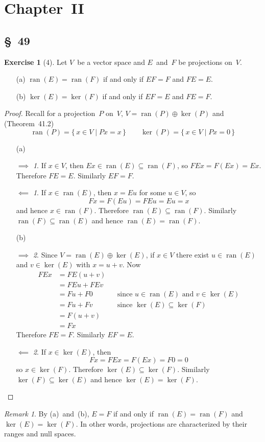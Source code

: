 \documentclass[letterpaper,12pt]{article}
\newcommand{\dsum}{\oplus}
\DeclareMathOperator{\ran}{ran}
\theoremstyle{definition}
\newtheorem*{exer}{Exercise}
\theoremstyle{remark}
\newtheorem*{rmk}{Remark}
\theoremstyle{direction}
\newtheorem*{fwd}{\(\implies\)}
\newtheorem*{bwd}{\(\impliedby\)}
\begin{document}
\section*{Chapter~II}
\subsection*{\S~49}
\begin{exer}[4]
Let \(V\)~be a vector space and \(E\)~and~\(F\) be projections on~\(V\).
\begin{enumerate}[itemsep=0pt]
\item[(a)] \(\ran(E)=\ran(F)\) if and only if \(EF=F\) and \(FE=E\).
\item[(b)] \(\ker(E)=\ker(F)\) if and only if \(EF=E\) and \(FE=F\).
\end{enumerate}
\end{exer}
\begin{proof}
Recall for a projection~\(P\) on~\(V\), \(V=\ran(P)\dsum\ker(P)\) and (Theorem~41.2)
\[\ran(P)=\{\,x\in V\mid Px=x\,\}\qquad\ker(P)=\{\,x\in V\mid Px=0\,\}\]
\begin{enumerate}[itemsep=0pt]
\item[(a)]
\begin{fwd}
If \(x\in V\), then \(Ex\in\ran(E)\subseteq\ran(F)\), so \(FEx=F(Ex)=Ex\). Therefore \(FE=E\). Similarly \(EF=F\).
\end{fwd}
\begin{bwd}
If \(x\in\ran(E)\), then \(x=Eu\) for some \(u\in V\), so
\[Fx=F(Eu)=FEu=Eu=x\]
and hence \(x\in\ran(F)\). Therefore \(\ran(E)\subseteq\ran(F)\). Similarly \(\ran(F)\subseteq\ran(E)\) and hence \(\ran(E)=\ran(F)\).
\end{bwd}
\item[(b)]
\begin{fwd}
Since \(V=\ran(E)\dsum\ker(E)\), if \(x\in V\) there exist \(u\in\ran(E)\) and \(v\in\ker(E)\) with \(x=u+v\). Now
\begin{align*}
FEx&=FE(u+v)&&\\
	&=FEu+FEv&&\\
	&=Fu+F0&&\text{since \(u\in\ran(E)\) and \(v\in\ker(E)\)}\\
	&=Fu+Fv&&\text{since \(\ker(E)\subseteq\ker(F)\)}\\
	&=F(u+v)\\
	&=Fx
\end{align*}
Therefore \(FE=F\). Similarly \(EF=E\).
\end{fwd}
\begin{bwd}
If \(x\in\ker(E)\), then
\[Fx=FEx=F(Ex)=F0=0\]
so \(x\in\ker(F)\). Therefore \(\ker(E)\subseteq\ker(F)\). Similarly \(\ker(F)\subseteq\ker(E)\) and hence \(\ker(E)=\ker(F)\).\qedhere
\end{bwd}
\end{enumerate}
\end{proof}
\begin{rmk}
By (a)~and~(b), \(E=F\) if and only if \(\ran(E)=\ran(F)\) and \(\ker(E)=\ker(F)\). In other words, projections are characterized by their ranges and null spaces.
\end{rmk}
\end{document}
